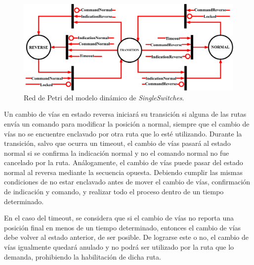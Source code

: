 	\begin{figure}[H]
		\centering
		\includegraphics[width=1\textwidth]{Figuras/SSW_Petri}
		\centering\caption{Red de Petri del modelo dinámico de \textit{SingleSwitches}.}
		\label{fig:SSW_Petri}
	\end{figure}
	
	Un cambio de vías en estado reversa iniciará su transición si alguna de las rutas envía un comando para modificar la posición a normal, siempre que el cambio de vías no se encuentre enclavado por otra ruta que lo esté utilizando. Durante la transición, salvo que ocurra un timeout, el cambio de vías pasará al estado normal si se confirma la indicación normal y no el comando normal no fue cancelado por la ruta. Análogamente, el cambio de vías puede pasar del estado normal al reversa mediante la secuencia opuesta. Debiendo cumplir las mismas condiciones de no estar enclavado antes de mover el cambio de vías, confirmación de indicación y comando, y realizar todo el proceso dentro de un tiempo determinado.
	
	En el caso del timeout, se considera que si el cambio de vías no reporta una posición final en menos de un tiempo determinado, entonces el cambio de vías debe volver al estado anterior, de ser posible. De lograrse este o no, el cambio de vías igualmente quedará anulado y no podrá ser utilizado por la ruta que lo demanda, prohibiendo la habilitación de dicha ruta.
